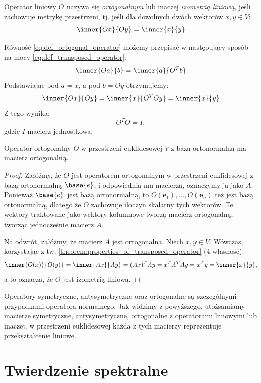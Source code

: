 \begin{definition}\label{def:ortogonal_operator}
    Operator liniowy $O$ nazywa się \textit{ortogonalnym} lub inaczej \textit{izometrią liniową}, jeśli zachowuje metrykę przestrzeni, tj. jeśli dla dowolnych dwóch wektorów $x, y \in V$:
    \begin{equation}\label{eq:def_ortogonal_operator}
        \inner{Ox}{Oy} = \inner{x}{y}
    \end{equation}
\end{definition}
Równość \eqref{eq:def_ortogonal_operator} możemy przepisać w następujący sposób na mocy \eqref{eq:def_transposed_operator}:
$$\inner{Oa}{b} = \inner{a}{O^Tb}$$
Podstawiając pod $a = x$, a pod $b = Oy$ otrzymujemy:
$$\inner{Ox}{Oy} = \inner{x}{O^TOy} = \inner{x}{y}$$
Z tego wynika:
\begin{equation}\label{eq:def_ortogonal_operator_2}
    O^TO = I,
\end{equation} gdzie $I$ macierz jednostkowa. 

\begin{theorem}
    Operator ortogonalny $O$ w przestrzeni euklidesowej $V$ z bazą ortonormalną ma macierz ortogonalną.
\end{theorem}
\begin{proof}
    Załóżmy, że $O$ jest operatorem ortogonalnym w przestrzeni euklidesowej z bazą ortonormalną $\base{e}$, i odpowiednią mu macierzą, oznaczymy ją jako $A$.
    Ponieważ $\base{e}$ jest bazą ortonormalną, to $O(\mathbf{e}_1), \ldots, O(\mathbf{e}_n)$ też jest bazą ortonormalną, dlatego że $O$ zachowuje iloczyn skalarny tych wektorów. Te wektory traktowane jako wektory kolumnowe tworzą macierz ortogonalną, tworząc jednocześnie macierz $A$.

    Na odwrót, załóżmy, że macierz $A$ jest ortogonalna. Niech $x, y \in V$. Wówczas, korzystając z tw. \ref{theorem:properties_of_transposed_operator} (4 własność):
    $$\inner{O(x)}{O(y)} = \inner{Ax}{Ay} = (Ax)^TAy = x^TA^TAy = x^Ty = \inner{x}{y},$$
    a to oznacza, że $O$ jest izometrią liniową.
\end{proof}

Operatory symetryczne, antysymetryczne oraz ortogonalne są szczególnymi przypadkami operatora normalnego.
Jak widzimy z powyższego, utożsamiamy macierze symetryczne, antysymetryczne, ortogonalne z operatorami liniowymi lub inaczej, w przestrzeni euklidesowej każda z tych macierzy reprezentuje przekształcenie liniowe.

\section{Twierdzenie spektralne}

